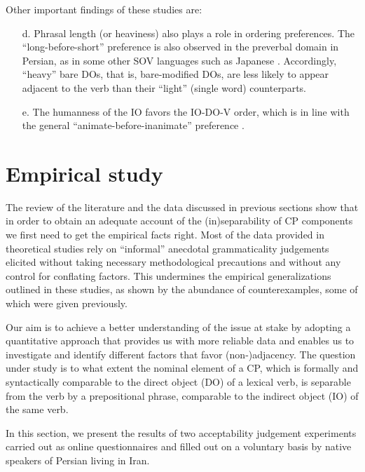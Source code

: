 \documentclass[output=paper]{langsci/langscibook}
\begin{document}
Other important findings of these studies are:

\begin{itemize}\label{ListWOClaims}
	\item[d.]  Phrasal length (or heaviness) also plays a role in ordering preferences. The ``long-before-short'' preference is also observed in the preverbal domain in Persian, as in some other SOV languages such as Japanese \citep{hawkins94,yamashita2001}. Accordingly, ``heavy'' bare DOs, that is, bare-modified DOs, are less likely to appear adjacent to the verb than their ``light'' (single word) counterparts.
	\item[e.] The humanness of the IO favors the IO-DO-V order, which is in line with the general  ``animate-before-inanimate'' preference \citep{bresnan07,branigan1999conceptual,collins1995indirect,Hoberg81a,kempen2004corpus,Rosenbach2002}.
\end{itemize}



\section{Empirical study}

The review of the literature and the data discussed in previous sections show that in order to obtain an adequate account of the (in)separability of CP components we first need to get the empirical facts right. Most of the data provided in theoretical studies rely on ``informal'' anecdotal grammaticality judgements elicited without taking necessary methodological precautions and without any control for conflating factors. This undermines the empirical generalizations outlined in these studies, as shown by the abundance of counterexamples, some of which were given previously.  

Our aim is to achieve a better understanding of the issue at stake by adopting a quantitative approach that provides us with more reliable data and enables us to investigate and identify different factors that favor (non-)adjacency. The question under study is to what extent the nominal element of a CP, which is formally and syntactically comparable to the direct object (DO) of a lexical verb, is separable from the verb by a prepositional phrase, comparable to the indirect object (IO) of the same verb.


In this section, we present the results of two acceptability judgement experiments carried out as online questionnaires and filled out on a voluntary basis by native speakers of Persian living in Iran.
\end{document}
